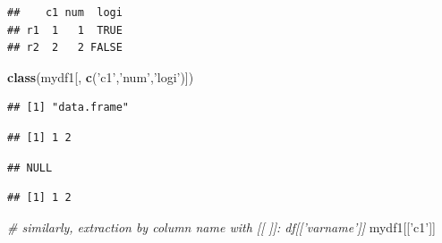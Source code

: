 \documentclass[]{book}
\newenvironment{Shaded}{\begin{snugshade}}{\end{snugshade}}
\newcommand{\KeywordTok}[1]{\textcolor[rgb]{0.13,0.29,0.53}{\textbf{{#1}}}}
\newcommand{\StringTok}[1]{\textcolor[rgb]{0.31,0.60,0.02}{{#1}}}
\newcommand{\CommentTok}[1]{\textcolor[rgb]{0.56,0.35,0.01}{\textit{{#1}}}}
\newcommand{\NormalTok}[1]{{#1}}
\theoremstyle{definition}
\theoremstyle{definition}
\theoremstyle{remark}
\begin{document}
\begin{verbatim}
##    c1 num  logi
## r1  1   1  TRUE
## r2  2   2 FALSE
\end{verbatim}

\begin{Shaded}
\begin{Highlighting}[]
\KeywordTok{class}\NormalTok{(mydf1[, }\KeywordTok{c}\NormalTok{(}\StringTok{'c1'}\NormalTok{,}\StringTok{'num'}\NormalTok{,}\StringTok{'logi'}\NormalTok{)])}
\end{Highlighting}
\end{Shaded}

\begin{verbatim}
## [1] "data.frame"
\end{verbatim}

\begin{Shaded}
\end{Shaded}

\begin{verbatim}
## [1] 1 2
\end{verbatim}

\begin{Shaded}
\end{Shaded}

\begin{verbatim}
## NULL
\end{verbatim}

\begin{Shaded}
\end{Shaded}

\begin{verbatim}
## [1] 1 2
\end{verbatim}

\begin{Shaded}
\begin{Highlighting}[]
\CommentTok{# similarly, extraction by column name with [[ ]]: df[['varname']]    }
\NormalTok{mydf1[[}\StringTok{'c1'}\NormalTok{]]}
\end{Highlighting}
\end{Shaded}
\end{document}
